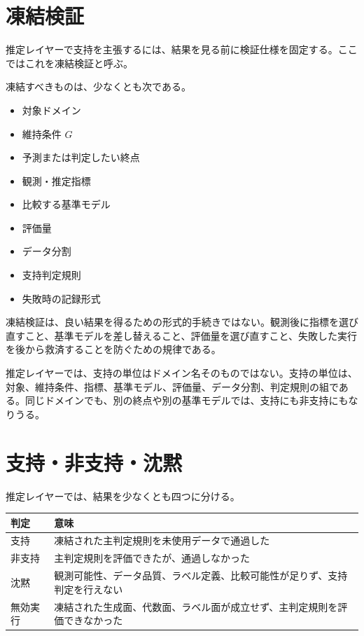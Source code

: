 \documentclass[12pt,a4paper]{article}
\begin{document}
\section{凍結検証}\label{ux51cdux7d50ux691cux8a3c}

推定レイヤーで支持を主張するには、結果を見る前に検証仕様を固定する。ここではこれを凍結検証と呼ぶ。

凍結すべきものは、少なくとも次である。

\begin{itemize}
\tightlist
\item
  対象ドメイン
\item
  維持条件 \(G\)
\item
  予測または判定したい終点
\item
  観測・推定指標
\item
  比較する基準モデル
\item
  評価量
\item
  データ分割
\item
  支持判定規則
\item
  失敗時の記録形式
\end{itemize}

凍結検証は、良い結果を得るための形式的手続きではない。観測後に指標を選び直すこと、基準モデルを差し替えること、評価量を選び直すこと、失敗した実行を後から救済することを防ぐための規律である。

推定レイヤーでは、支持の単位はドメイン名そのものではない。支持の単位は、対象、維持条件、指標、基準モデル、評価量、データ分割、判定規則の組である。同じドメインでも、別の終点や別の基準モデルでは、支持にも非支持にもなりうる。

\section{支持・非支持・沈黙}\label{ux652fux6301ux975eux652fux6301ux6c88ux9ed9}

推定レイヤーでは、結果を少なくとも四つに分ける。

{\def\LTcaptype{table} %
\begin{longtable}[]{@{}
  >{\raggedright\arraybackslash}p{}
  >{\raggedright\arraybackslash}p{}@{}}
\toprule\noalign{}
\begin{minipage}[b]{\linewidth}\raggedright
判定
\end{minipage} & \begin{minipage}[b]{\linewidth}\raggedright
意味
\end{minipage} \\
\midrule\noalign{}
\endhead
\bottomrule\noalign{}
\endlastfoot
支持 & 凍結された主判定規則を未使用データで通過した \\
非支持 & 主判定規則を評価できたが、通過しなかった \\
沈黙 & 観測可能性、データ品質、ラベル定義、比較可能性が足りず、支持判定を行えない \\
無効実行 & 凍結された生成面、代数面、ラベル面が成立せず、主判定規則を評価できなかった \\
\end{longtable}
}
\end{document}
